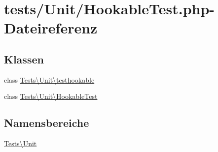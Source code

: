 \hypertarget{HookableTest_8php}{}\section{tests/\+Unit/\+Hookable\+Test.php-\/\+Dateireferenz}
\label{HookableTest_8php}
\subsection*{Klassen}
\begin{DoxyCompactItemize}
\item 
class \hyperlink{classTests_1_1Unit_1_1testhookable}{Tests\textbackslash{}\+Unit\textbackslash{}testhookable}
\item 
class \hyperlink{classTests_1_1Unit_1_1HookableTest}{Tests\textbackslash{}\+Unit\textbackslash{}\+Hookable\+Test}
\end{DoxyCompactItemize}
\subsection*{Namensbereiche}
\begin{DoxyCompactItemize}
\item 
 \hyperlink{namespaceTests_1_1Unit}{Tests\textbackslash{}\+Unit}
\end{DoxyCompactItemize}
